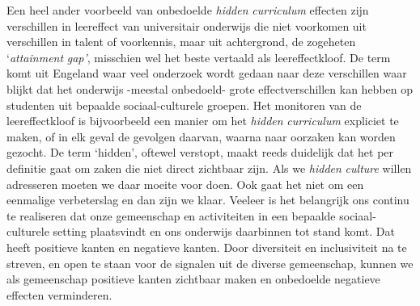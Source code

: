 \documentclass[smallauthor, chapterhaspagenum, nochapterinheader, pagenuminheader,  bigchapnum,medium2, tocpages,  garamond, titleinheader]{jote-book}
\begin{document}
	Een heel ander voorbeeld van onbedoelde \emph{hidden}\emph{ curriculum} effecten zijn verschillen in leereffect van universitair onderwijs die niet voorkomen uit verschillen in talent of voorkennis, maar uit achtergrond, de zogeheten ‘\emph{attainment}\emph{ gap}\emph{'}, misschien wel het beste vertaald als leereffectkloof. De term komt uit Engeland waar veel onderzoek wordt gedaan naar deze verschillen waar blijkt dat het onderwijs -meestal onbedoeld- grote effectverschillen kan hebben op studenten uit bepaalde sociaal-culturele groepen. Het monitoren van de leereffectkloof is bijvoorbeeld een manier om het \emph{hidden}\emph{ curriculum} expliciet te maken, of in elk geval de gevolgen daarvan, waarna naar oorzaken kan worden gezocht. De term ‘hidden', oftewel verstopt, maakt reeds duidelijk dat het per definitie gaat om zaken die niet direct zichtbaar zijn. Als we \emph{hidden}\emph{ culture} willen adresseren moeten we daar moeite voor doen. Ook gaat het niet om een eenmalige verbeterslag en dan zijn we klaar. Veeleer is het belangrijk ons continu te realiseren dat onze gemeenschap en activiteiten in een bepaalde sociaal-culturele setting plaatsvindt en ons onderwijs daarbinnen tot stand komt. Dat heeft positieve kanten en negatieve kanten. Door diversiteit en inclusiviteit na te streven, en open te staan voor de signalen uit de diverse gemeenschap, kunnen we als gemeenschap positieve kanten zichtbaar maken en onbedoelde negatieve effecten verminderen.
\end{document}
